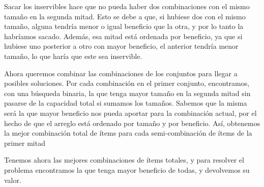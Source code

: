 \documentclass[10pt, a4paper]{article}
\begin{document}
Sacar los inservibles hace que no pueda haber dos combinaciones con el mismo tamaño en la segunda mitad. Esto se debe a que, si hubiese dos con el mismo tamaño, alguna tendría menor o igual beneficio que la otra, y por lo tanto la habríamos sacado. Además, esa mitad está ordenada por beneficio, ya que si hubiese uno posterior a otro con mayor beneficio, el anterior tendría menor tamaño, lo que haría que este sea inservible.\par
Ahora queremos combinar las combinaciones de los conjuntos para llegar a posibles soluciones. Por cada combinación en el primer conjunto, encontramos, con una búsqueda binaria, la que tenga mayor tamaño en la segunda mitad sin pasarse de la capacidad total si sumamos los tamaños. Sabemos que la misma será la que mayor beneficio nos pueda aportar para la combinación actual, por el hecho de que el arreglo está ordenado por tamaño y por beneficio. Así, obtenemos la mejor combinación total de ítems para cada semi-combinación de ítems de la primer mitad\par
Tenemos ahora las mejores combinaciones de ítems totales, y para resolver el problema encontramos la que tenga mayor beneficio de todas, y devolvemos su valor.
\end{document}
